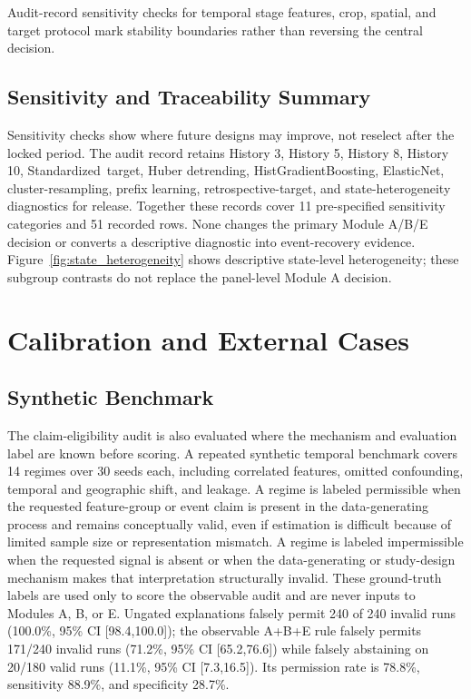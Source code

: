 \documentclass[conference]{IEEEtran}
\begin{document}
Audit-record sensitivity checks for temporal stage features, crop, spatial, and
target protocol mark stability boundaries rather than reversing the central
decision.

\subsection{Sensitivity and Traceability Summary}
Sensitivity checks show where future designs may improve, not reselect after the
locked period. The audit record retains History 3, History 5, History 8,
History 10, \mbox{Standardized target}, Huber detrending, HistGradientBoosting,
ElasticNet, cluster-resampling, prefix learning, retrospective-target, and
state-heterogeneity diagnostics for release.
Together these records cover 11 pre-specified sensitivity categories and 51
recorded rows. None changes the primary Module
A/B/E decision or converts a descriptive diagnostic into event-recovery evidence.
Figure~\ref{fig:state_heterogeneity} shows descriptive state-level heterogeneity;
these subgroup contrasts do not replace the panel-level Module A decision.

\FloatBarrier
\section{Calibration and External Cases}
\subsection{Synthetic Benchmark}
The claim-eligibility audit is also evaluated where the mechanism and evaluation
label are known before scoring. A repeated synthetic temporal benchmark covers 14
regimes over 30 seeds each, including correlated features, omitted confounding,
temporal and geographic shift, and leakage. A regime is labeled permissible when
the requested feature-group or event claim is present in the data-generating
process and remains conceptually valid, even if estimation is difficult because
of limited sample size or representation mismatch. A regime is labeled
impermissible when the requested signal is absent or when the data-generating or
study-design mechanism makes that interpretation structurally invalid. These
ground-truth labels are used only to score the observable audit and are never
inputs to Modules A, B, or E. Ungated explanations falsely permit 240 of 240
invalid runs (100.0\%, 95\% CI [98.4,100.0]); the observable A+B+E rule falsely permits
171/240 invalid runs (71.2\%,
95\% CI [65.2,76.6]) while falsely abstaining on
20/180 valid runs
(11.1\%, 95\% CI [7.3,16.5]). Its permission rate
is 78.8\%, sensitivity 88.9\%,
and specificity 28.7\%.
\end{document}
